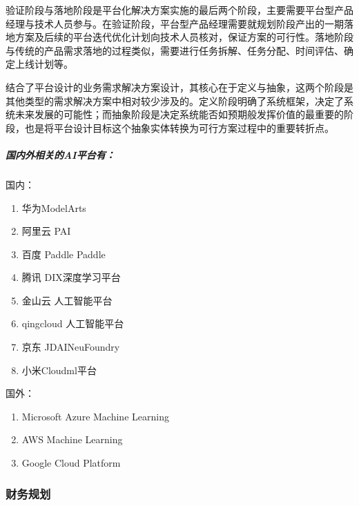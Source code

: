 \documentclass[letterpaper,11pt,english]{sphinxmanual}
\begin{document}
验证阶段与落地阶段是平台化解决方案实施的最后两个阶段，主要需要平台型产品经理与技术人员参与。在验证阶段，平台型产品经理需要就规划阶段产出的一期落地方案及后续的平台迭代优化计划向技术人员核对，保证方案的可行性。落地阶段与传统的产品需求落地的过程类似，需要进行任务拆解、任务分配、时间评估、确定上线计划等。

结合了平台设计的业务需求解决方案设计，其核心在于定义与抽象，这两个阶段是其他类型的需求解决方案中相对较少涉及的。定义阶段明确了系统框架，决定了系统未来发展的可能性；而抽象阶段是决定系统能否如预期般发挥价值的最重要的阶段，也是将平台设计目标这个抽象实体转换为可行方案过程中的重要转折点。


\subparagraph{国内外相关的AI平台有：}
\label{\detokenize{chapter_introduction/platform:id9}}
国内：
\begin{enumerate}
%
\item {} 
华为ModelArts

\item {} 
阿里云 PAI

\item {} 
百度 Paddle Paddle

\item {} 
腾讯 DI\sphinxhyphen{}X深度学习平台

\item {} 
金山云 人工智能平台

\item {} 
qingcloud 人工智能平台

\item {} 
京东 JDAINeuFoundry

\item {} 
小米Cloud\sphinxhyphen{}ml平台

\end{enumerate}

国外：
\begin{enumerate}
%
\item {} 
Microsoft Azure Machine Learning

\item {} 
AWS Machine Learning

\item {} 
Google Cloud Platform

\end{enumerate}


\subsubsection{财务规划}
\label{\detokenize{chapter_introduction/money:id1}}\label{\detokenize{chapter_introduction/money::doc}}
\end{document}
